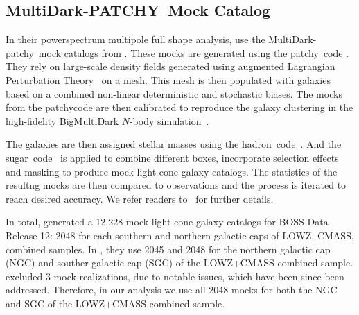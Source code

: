 \documentclass[12pt, letterpaper, preprint]{aastex}
\newcommand{\patchy}{{\fontshape\scdefault\selectfont patchy}}
\begin{document}
\subsection{MultiDark-PATCHY~Mock Catalog} \label{sec:patchy}
In their powerspectrum multipole full shape analysis, \cite{beutler2017}
use the MultiDark-\patchy~mock catalogs from \cite{kitaura2016}. 
These mocks are generated using the \patchy~code \citep{kitaura2014,kitaura2015}. 
They rely on large-scale density fields generated using augmented
Lagrangian Perturbation Theory~\citep[ALPT;][]{kitaura2013} on a mesh.
This mesh is then populated with galaxies based on a combined non-linear
deterministic and stochastic biases. The mocks from the \patchy code 
are then calibrated to reproduce the galaxy clustering in the 
high-fidelity BigMultiDark $N$-body simulation~\citep{rodriguez-torres2016, klypin2016}. 

The galaxies are then assigned stellar masses using the 
{\fontshape\scdefault\selectfont hadron}~code~\citep{zhao2015}.
And the {\fontshape\scdefault\selectfont sugar}~code~\citep{rodriguez-torres2016} 
is applied to combine different boxes, incorporate selection
effects and masking to produce mock light-cone galaxy catalogs. 
The statistics of the resultng mocks are then compared to 
observations and the process is iterated to reach desired 
accuracy. We refer readers to~\cite{kitaura2016} for further 
details. 

In total, \cite{kitaura2016} generated a 12,228 mock light-cone 
galaxy catalogs for BOSS Data Release 12: 2048 for each southern 
and northern galactic caps of LOWZ, CMASS, combined samples. 
In \cite{beutler2017}, they use 2045 and 2048 for the northern 
galactic cap (NGC) and souther galactic cap (SGC) of the LOWZ+CMASS
combined sample. \cite{beutler2017} excluded 3 mock realizations, 
due to notable issues, which have been since been addressed. Therefore, 
in our analysis we use all 2048 mocks for both the NGC and SGC of 
the LOWZ+CMASS combined sample.
\end{document}
